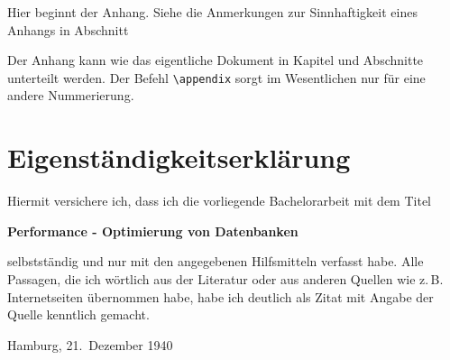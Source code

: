 
\printbibliography

\appendix

Hier beginnt der Anhang.
Siehe die Anmerkungen zur Sinnhaftigkeit eines Anhangs in Abschnitt%

Der Anhang kann wie das eigentliche Dokument in Kapitel und Abschnitte unterteilt werden.
Der Befehl \verb|\appendix| sorgt im Wesentlichen nur für eine andere Nummerierung.

\clearpage

\thispagestyle{empty}

\section*{Eigenständigkeitserklärung}

Hiermit versichere ich, dass ich die vorliegende Bachelorarbeit mit dem Titel
\begin{center}
  \textbf{Performance - Optimierung von Datenbanken}
\end{center}
selbstständig und nur mit den angegebenen Hilfsmitteln verfasst habe.
Alle Passagen, die ich wörtlich aus der Literatur oder aus anderen Quellen wie z.\,B. Internetseiten übernommen habe, habe ich deutlich als Zitat mit Angabe der Quelle kenntlich gemacht.

\vspace{2cm}
Hamburg, 21.\ Dezember 1940
